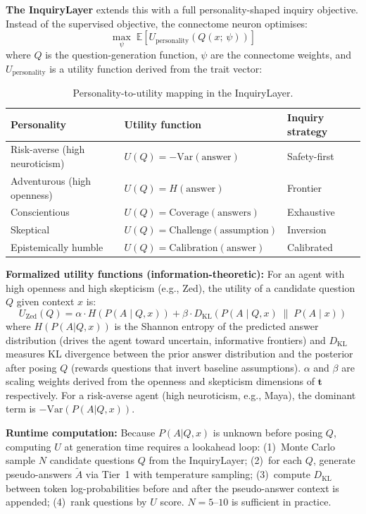 \documentclass[11pt,a4paper]{article}
\begin{document}
\textbf{The InquiryLayer} extends this with a full personality-shaped inquiry objective.
Instead of the supervised objective, the connectome neuron optimises:
\[
  \max_{\psi} \; \mathbb{E}\!\left[U_{\text{personality}}\!\left(Q(x;\, \psi)\right)\right]
\]
where $Q$ is the question-generation function, $\psi$ are the connectome weights, and
$U_{\text{personality}}$ is a utility function derived from the trait vector:

\begin{table}[h!]
\centering
\begin{tabular}{lll}
\toprule
\textbf{Personality} & \textbf{Utility function} & \textbf{Inquiry strategy} \\
\midrule
Risk-averse (high neuroticism) & $U(Q) = -\text{Var}(\text{answer})$ & Safety-first \\
Adventurous (high openness)   & $U(Q) = H(\text{answer})$            & Frontier \\
Conscientious                 & $U(Q) = \text{Coverage}(\text{answers})$ & Exhaustive \\
Skeptical                     & $U(Q) = \text{Challenge}(\text{assumption})$ & Inversion \\
Epistemically humble          & $U(Q) = \text{Calibration}(\text{answer})$ & Calibrated \\
\bottomrule
\end{tabular}
\caption{Personality-to-utility mapping in the InquiryLayer.}
\end{table}

\textbf{Formalized utility functions (information-theoretic):} For an agent with high
openness and high skepticism (e.g., Zed), the utility of a candidate question $Q$ given
context $x$ is:
\[
  U_{\text{Zed}}(Q) = \alpha \cdot H\!\left(P(A \mid Q, x)\right)
  + \beta \cdot D_{\mathrm{KL}}\!\left(P(A \mid Q, x) \;\|\; P(A \mid x)\right)
\]
where $H(P(A|Q,x))$ is the Shannon entropy of the predicted answer distribution
(drives the agent toward uncertain, informative frontiers) and $D_{\mathrm{KL}}$ measures
KL divergence between the prior answer distribution and the posterior after posing $Q$
(rewards questions that invert baseline assumptions). $\alpha$ and $\beta$ are scaling
weights derived from the openness and skepticism dimensions of $\mathbf{t}$ respectively.
For a risk-averse agent (high neuroticism, e.g., Maya), the dominant term is
$-\text{Var}(P(A|Q,x))$.

\textbf{Runtime computation:} Because $P(A|Q,x)$ is unknown before posing $Q$, computing
$U$ at generation time requires a lookahead loop: (1)~Monte Carlo sample $N$ candidate
questions $Q$ from the InquiryLayer; (2)~for each $Q$, generate pseudo-answers
$\tilde{A}$ via Tier~1 with temperature sampling; (3)~compute $D_{\mathrm{KL}}$ between
token log-probabilities before and after the pseudo-answer context is appended;
(4)~rank questions by $U$ score. $N = 5$--$10$ is sufficient in practice.
\end{document}
